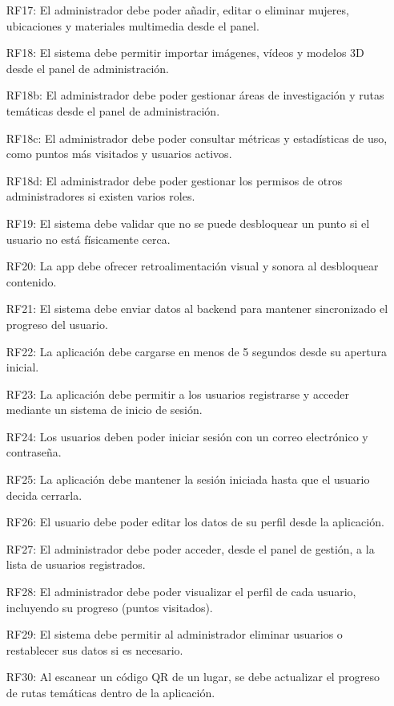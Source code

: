 \begin{itemize}
\item[RF17:] El administrador debe poder añadir, editar o eliminar mujeres, ubicaciones y materiales multimedia desde el panel.
\item[RF18:] El sistema debe permitir importar imágenes, vídeos y modelos 3D desde el panel de administración.
\item[RF18b:] El administrador debe poder gestionar áreas de investigación y rutas temáticas desde el panel de administración. %
\item[RF18c:] El administrador debe poder consultar métricas y estadísticas de uso, como puntos más visitados y usuarios activos. %
\item[RF18d:] El administrador debe poder gestionar los permisos de otros administradores si existen varios roles. %
\item[RF19:] El sistema debe validar que no se puede desbloquear un punto si el usuario no está físicamente cerca.
\item[RF20:] La app debe ofrecer retroalimentación visual y sonora al desbloquear contenido.
\item[RF21:] El sistema debe enviar datos al backend para mantener sincronizado el progreso del usuario.
\item[RF22:] La aplicación debe cargarse en menos de 5 segundos desde su apertura inicial.
\item[RF23:] La aplicación debe permitir a los usuarios registrarse y acceder mediante un sistema de inicio de sesión.
\item[RF24:] Los usuarios deben poder iniciar sesión con un correo electrónico y contraseña.
\item[RF25:] La aplicación debe mantener la sesión iniciada hasta que el usuario decida cerrarla.
\item[RF26:] El usuario debe poder editar los datos de su perfil desde la aplicación.
\item[RF27:] El administrador debe poder acceder, desde el panel de gestión, a la lista de usuarios registrados.
\item[RF28:] El administrador debe poder visualizar el perfil de cada usuario, incluyendo su progreso (puntos visitados).
\item[RF29:] El sistema debe permitir al administrador eliminar usuarios o restablecer sus datos si es necesario.
\item[RF30:] Al escanear un código QR de un lugar, se debe actualizar el progreso de rutas temáticas dentro de la aplicación.

\end{itemize}
